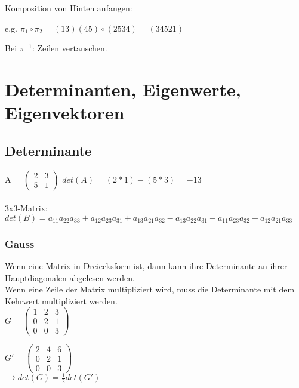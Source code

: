 \documentclass[a4paper,landscape, 11pt]{article}
\begin{document}
\begin{multicols}{5}
\begin{small}
    Komposition von Hinten anfangen:
    
    e.g. $\pi_1\circ\pi_2=(13)(45)\circ(2534)=(34521)$
    
    Bei $\pi^{-1}$: Zeilen vertauschen.
    
    \section{Determinanten, Eigenwerte, Eigenvektoren}
        \subsection{Determinante}
        A = $\left(
        \begin{matrix}
            2 & 3 \\
            5 & 1
        \end{matrix}
        \right)$ \hspace{2pt} 
        $det(A) = (2*1) - (5*3) = -13$ \\ \\
        3x3-Matrix:\\
        $det(B) = a_{11} a_{22} a_{33} + a_{12} a_{23} a_{31} + a_{13} a_{21} a_{32} - a_{13} a_{22} a_{31} - a_{11} a_{23} a_{32} - a_{12} a_{21} a_{33}$  
        
        \subsubsection{Gauss}
        Wenn eine Matrix in Dreiecksform ist, dann kann ihre Determinante an ihrer Hauptdiagonalen abgelesen werden. \\
        Wenn eine Zeile der Matrix multipliziert wird, muss die Determinante mit dem Kehrwert multipliziert werden.\\
        
        $G = \begin{pmatrix}
            1 & 2 & 3 \\
            0 & 2 & 1 \\
            0 & 0 & 3
        \end{pmatrix}$
        \hspace{10pt}

        $G' = \begin{pmatrix}
        
        2 & 4 & 6 \\
        0 & 2 & 1 \\
        0 & 0 & 3
        \end{pmatrix}
        $
        \\
        $\rightarrow det(G) = \frac{1}{2} det(G')$

\end{small}
\end{multicols}
\end{document}
